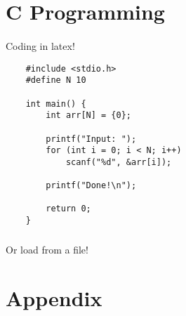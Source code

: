 \documentclass{article}
\begin{document}
\section{C Programming}
\paragraph{}
    Coding in latex!
    \begin{lstlisting}
    #include <stdio.h>
    #define N 10
    
    int main() {
        int arr[N] = {0};
        
        printf("Input: ");
        for (int i = 0; i < N; i++)
            scanf("%d", &arr[i]);
        
        printf("Done!\n");
    
        return 0;
    }
    \end{lstlisting}
    \subparagraph{}
        Or load from a file!
        

\newpage

\printbibliography
% 

\newpage

\section{Appendix}
\begin{appendix}
    \listoffigures
    \listoftables
\end{appendix}
\end{document}
